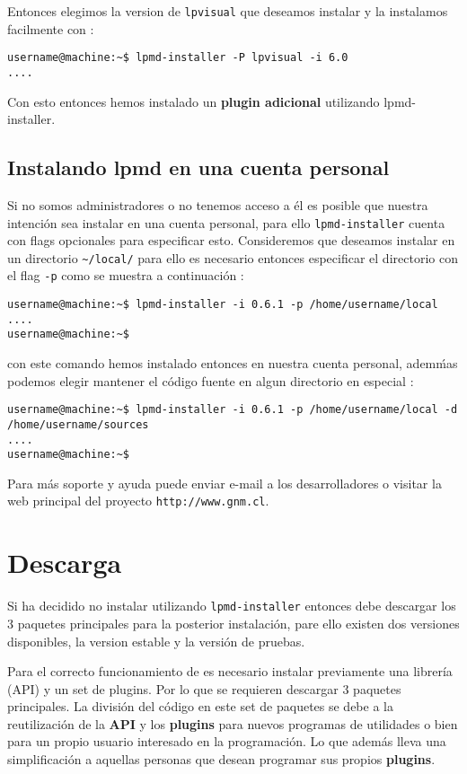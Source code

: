 Entonces elegimos la version de \verb|lpvisual| que deseamos instalar y la instalamos facilmente con :

\begin{verbatim}
username@machine:~$ lpmd-installer -P lpvisual -i 6.0
....
\end{verbatim}

Con esto entonces hemos instalado un \textbf{plugin adicional} utilizando lpmd-installer.

\subsection{Instalando lpmd en una cuenta personal}

Si no somos administradores o no tenemos acceso a \'el es posible que nuestra intenci\'on sea instalar {\lpmd} en una cuenta personal, para ello \verb|lpmd-installer| cuenta con flags opcionales para especificar  esto. Consideremos que deseamos instalar {\lpmd} en un directorio \verb|~/local/| para ello es necesario entonces especificar el directorio con el flag \verb|-p| como se muestra a continuaci\'on :

\begin{verbatim}
username@machine:~$ lpmd-installer -i 0.6.1 -p /home/username/local
....
username@machine:~$
\end{verbatim}

con este comando hemos instalado entonces {\lpmd} en nuestra cuenta personal, adem\'mas podemos elegir mantener el c\'odigo fuente en algun directorio en especial :

\begin{verbatim}
username@machine:~$ lpmd-installer -i 0.6.1 -p /home/username/local -d /home/username/sources
....
username@machine:~$
\end{verbatim}

Para m\'as soporte y ayuda puede enviar e-mail a los desarrolladores o visitar la web principal del proyecto \verb|http://www.gnm.cl|.

\section{Descarga}

Si ha decidido no instalar {\lpmd} utilizando \verb|lpmd-installer| entonces debe descargar los 3 paquetes principales para la posterior instalaci\'on, pare ello existen dos versiones disponibles, la version estable y la versi\'on de pruebas.

Para el correcto funcionamiento de {\lpmd} es necesario instalar previamente una librer\'ia (API) y un set de plugins. Por lo que se requieren descargar 3 paquetes principales. La divisi\'on del c\'odigo en este set de paquetes se debe a la reutilizaci\'on de la \textbf{API} y los \textbf{plugins} para nuevos programas de utilidades o bien para un propio usuario interesado en la programaci\'on. Lo que adem\'as lleva una simplificaci\'on a aquellas personas que desean programar sus propios \textbf{plugins}.

